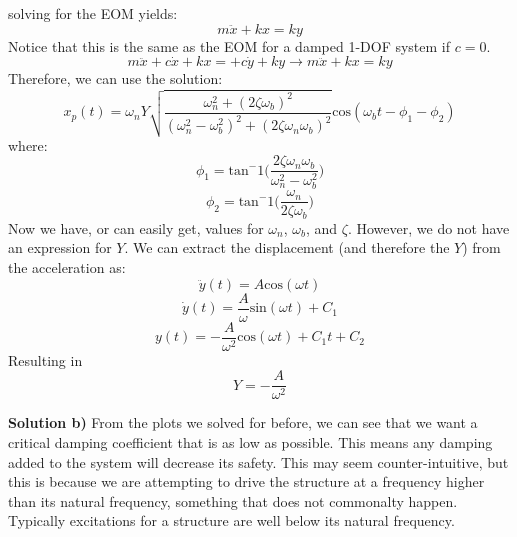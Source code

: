 \documentclass[12pt,a4paper]{article}
\begin{document}
			solving for the EOM yields:
			\begin{equation}
				m\ddot{x} + kx = ky
			\end{equation} 				
			Notice that this is the same as the EOM for a damped 1-DOF system if $c=0$.	
			\begin{equation}
			m\ddot{x} + c\dot{x} + kx = + c\dot{y} + ky \rightarrow m\ddot{x} + kx = ky
			\end{equation}
			Therefore, we can use the solution:
			\begin{equation}
				x_p(t) = 	\omega_n Y   \sqrt{\frac{\omega_n^2 + (2 \zeta \omega_b)^2 }{(\omega_n^2 - \omega_b^2)^2 +  (2\zeta \omega_n \omega_b)^2} }  \text{cos}(\omega_bt - \phi_1 - \phi_2)
			\end{equation}
			where:
			\begin{equation}
				\phi_1 = \text{tan}^-1\bigg(\frac{2\zeta \omega_n \omega_b}{\omega_n^2 - \omega_b^2}\bigg)
			\end{equation}	
			\begin{equation}
				\phi_2 = \text{tan}^-1\bigg(\frac{\omega_n}{2\zeta \omega_b}\bigg)
			\end{equation}
			Now we have, or can easily get, values for $\omega_n$, $\omega_b$, and $\zeta$. However, we do not have an expression for $Y$. We can extract the displacement (and therefore the $Y$) from the acceleration as:
			\begin{equation}
				\ddot{y}(t) = A \text{cos}(\omega t)
			\end{equation} 				
			\begin{equation}
				\dot{y}(t) = \frac{A}{\omega} \text{sin}(\omega t) + C_1
			\end{equation} 					
			\begin{equation}
				y(t) = - \frac{A}{\omega^2} \text{cos}(\omega t) + C_1t + C_2
			\end{equation} 					
			Resulting in 
			\begin{equation}
				Y = -\frac{A}{\omega^2}
			\end{equation} 			
			
			\textbf{Solution b)}
			From the plots we solved for before, we can see that we want a critical damping coefficient that is as low as possible. This means any damping added to the system will decrease its safety. This may seem counter-intuitive, but this is because we are attempting to drive the structure at a frequency higher than its natural frequency, something that does not commonalty happen. Typically excitations for a structure are well below its natural frequency.  			
			
			
				
\end{document}

